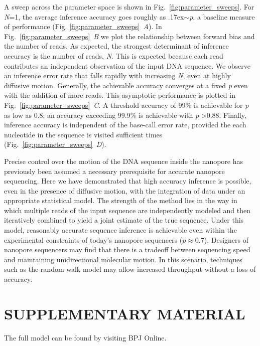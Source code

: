 \documentclass{biophys_letter}
\begin{document}
A sweep across the parameter space is shown in Fig.~\ref{fig:parameter_sweeps}.
For \emph{N}=1, the average inference accuracy goes roughly as {\raise.17ex\hbox{$\scriptstyle\sim$}}\emph{p}, a baseline measure of performance (Fig. \ref{fig:parameter_sweeps}\emph{~A}).
In Fig.~\ref{fig:parameter_sweeps}\emph{~B} we plot the relationship between forward bias and the number of reads.
As expected, the strongest determinant of inference accuracy is the number of reads, \emph{N}.
This is expected because each read contributes an independent observation of the input DNA sequence.
We observe an inference error rate that falls rapidly with increasing \emph{N}, even at highly diffusive motion. 
Generally, the achievable accuracy converges at a fixed \emph{p} even with the addition of more reads.
This asymptotic performance is plotted in Fig.~\ref{fig:parameter_sweeps}\emph{~C}.
A threshold accuracy of 99\% is achievable for \emph{p} as low as 0.8; an accuracy exceeding 99.9\% is achievable with \emph{p} \textgreater 0.88.
Finally, inference accuracy is independent of the base-call error rate, provided the each nucleotide in the sequence is visited sufficient times (Fig.~\ref{fig:parameter_sweeps}\emph{~D}).

Precise control over the motion of the DNA sequence inside the nanopore has previously been assumed a necessary prerequisite for accurate nanopore sequencing.
Here we have demonstrated that high accuracy inference is possible, even in the presence of diffusive motion, with the integration of data under an appropriate statistical model. 
The strength of the method lies in the way in which multiple reads of the input sequence are independently modeled and then iteratively combined to yield a joint estimate of the true sequence.
Under this model, reasonably accurate sequence inference is achievable even within the experimental constraints of today's nanopore sequencers ($p \approx 0.7$).
Designers of nanopore sequencers may find that there is a tradeoff between sequencing speed and maintaining unidirectional molecular motion.
In this scenario, techniques such as the random walk model may allow increased throughput without a loss of accuracy.

\section*{SUPPLEMENTARY MATERIAL}

The full model can be found by visiting BPJ Online.%
\end{document}

